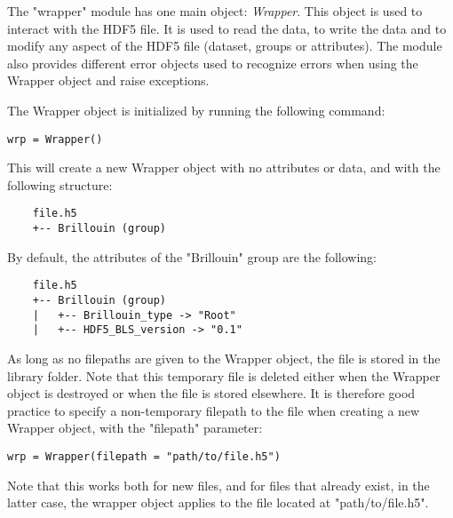 The "wrapper" module has one main object: \textit{Wrapper}. This object is used to interact with the HDF5 file. It is used to read the data, to write the data and to modify any aspect of the HDF5 file (dataset, groups or attributes). The module also provides different error objects used to recognize errors when using the Wrapper object and raise exceptions.

The Wrapper object is initialized by running the following command:
\begin{lstlisting}
wrp = Wrapper()
\end{lstlisting}

This will create a new Wrapper object with no attributes or data, and with the following structure:
\begin{verbatim}
    file.h5
    +-- Brillouin (group)
\end{verbatim}

By default, the attributes of the "Brillouin" group are the following:
\begin{verbatim}
    file.h5
    +-- Brillouin (group)
    |   +-- Brillouin_type -> "Root"
    |   +-- HDF5_BLS_version -> "0.1" 
\end{verbatim}

As long as no filepaths are given to the Wrapper object, the file is stored in the library folder. Note that this temporary file is deleted either when the Wrapper object is destroyed or when the file is stored elsewhere. It is therefore good practice to specify a non-temporary filepath to the file when creating a new Wrapper object, with the "filepath" parameter:
\begin{lstlisting}
wrp = Wrapper(filepath = "path/to/file.h5")
\end{lstlisting}
Note that this works both for new files, and for files that already exist, in the latter case, the wrapper object applies to the file located at "path/to/file.h5".
